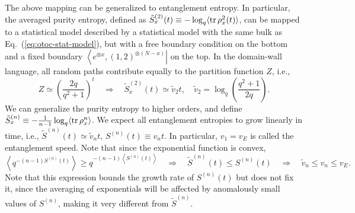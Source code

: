 \documentclass{SciPost}
\begin{document}
The above mapping can be generalized to entanglement entropy.
In particular, the averaged purity entropy, defined as $\tilde S^{(2)}_x(t) \equiv -\log_q \langle \operatorname{tr}\rho_x^2(t)\rangle$, can be mapped to a statistical model described by a statistical model with the same bulk as Eq.~(\ref{eq:otoc-stat-model}), but with a free boundary condition on the bottom and a fixed boundary $\left\langle e^{\otimes x},(1,2)^{\otimes (N-x)}\right|$ on the top.
In the domain-wall language, all random paths contribute equally to the partition function $Z$, i.e.,
\begin{equation}
	Z \simeq \left(\frac{2q}{q^2+1}\right)^t
	\quad\Longrightarrow\quad
	\tilde S^{(2)}_x(t) \simeq \tilde v_2 t,\quad
	\tilde v_2 =\log_q\left(\frac{q^2+1}{2q}\right).
\end{equation}
We can generalize the purity entropy to higher orders, and define $\tilde S_x^{(n)} \equiv -\frac{1}{n-1}\log_q\langle \operatorname{tr}\rho_x^n\rangle$.
We expect all entanglement entropies to grow linearly in time, i.e., $\tilde S^{(n)}(t) \simeq \tilde v_n t$, $S^{(n)}(t) \equiv v_n t$.
In particular, $v_1=v_E$ is called the entanglement speed.
Note that since the exponential function is convex, 
\begin{equation}
	\left\langle q^{-(n-1) S^{(n)}(t)} \right\rangle \ge q^{-(n-1)\left\langle S^{(n)}(t)\right\rangle} 
	\quad\Longrightarrow\quad
	\tilde S^{(n)}(t) \le S^{(n)}(t)
	\quad\Longrightarrow\quad
	\tilde v_n \le v_n\le v_E.
\end{equation}
Note that this expression bounds the growth rate of $S^{(n)}(t)$ but does not fix it, since the averaging of exponentials will be affected by anomalously small values of $S^{(n)}$, making it very different from $\tilde S^{(n)}$.
\end{document}

